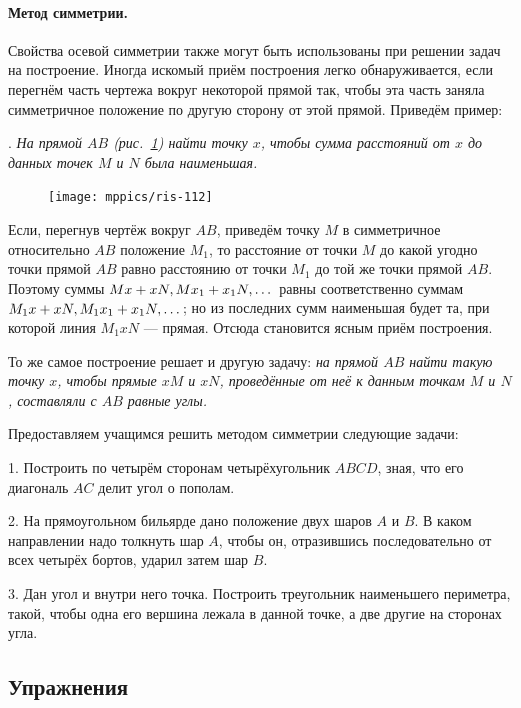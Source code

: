 \documentclass[twoside]{book}
\begin{document}

\paragraph{Метод симметрии.}\label{1938/102}
Свойства осевой симметрии также могут быть использованы при решении задач на построение.
Иногда искомый приём построения легко обнаруживается, если перегнём часть чертежа вокруг некоторой прямой так, чтобы эта часть заняла симметричное положение по другую сторону от этой прямой.
Приведём пример:

\smallskip
{}.
\emph{На прямой $AB$ \emph{(рис.~\ref{1938/ris-112})} найти точку $x$, чтобы сумма расстояний от $x$ до данных точек $M$ и $N$ была наименьшая.}

\begin{figure}
\centering
\texttt{[image: mppics/ris-112]}
\caption{}\label{1938/ris-112}
\end{figure}

Если, перегнув чертёж вокруг $AB$, приведём точку $M$ в симметричное относительно $AB$ положение $M_1$, то расстояние от точки $M$ до какой угодно точки прямой $AB$ равно расстоянию от точки $M_1$ до той же точки прямой $AB$.
Поэтому суммы $Mx+xN,  Mx_1\z+x_1N,\dots $ равны соответственно суммам $M_1x+xN, M_1x_1\z+x_1N, \dots$;
но из последних сумм наименьшая будет та, при которой линия $M_1xN$ — прямая.
Отсюда становится ясным приём построения.

То же самое построение решает и другую задачу:
\emph{на прямой $AB$ найти такую точку $x$, чтобы прямые $xM$ и $xN$, проведённые от неё к данным точкам $M$ и $N$, составляли с $AB$ равные углы.}

Предоставляем учащимся решить методом симметрии следующие задачи:

\medskip

1.
Построить по четырём сторонам четырёхугольник $ABCD$, зная, что его диагональ $AC$ делит угол о пополам.

2.
На прямоугольном бильярде дано положение двух шаров $A$ и $B$.
В каком направлении надо толкнуть шар $A$, чтобы он, отразившись последовательно от всех четырёх бортов, ударил затем шар $B$.

3.
Дан угол и внутри него точка.
Построить треугольник наименьшего периметра, такой, чтобы одна его вершина лежала в данной точке, а две другие на сторонах угла.

\subsection*{Упражнения}
\end{document}
